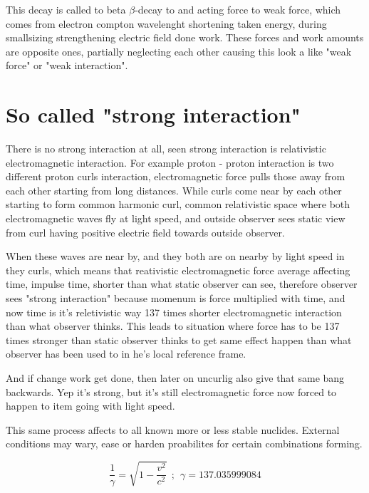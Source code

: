 This decay is called to beta $\beta$-decay to and acting force to weak force,
which comes from electron compton wavelenght shortening taken energy, during
smallsizing strengthening electric field done work. These forces and work
amounts are opposite ones, partially neglecting each other causing this look a
like "weak force" or "weak interaction".

\section{So called "strong interaction"}
\label{strong_interaction}

There is no strong interaction at all, seen strong interaction is relativistic
electromagnetic interaction. For example proton - proton interaction is two
different proton curls interaction, electromagnetic force pulls those away from
each other starting from long distances. While curls come near by each other
starting to form common harmonic curl, common relativistic space where both
electromagnetic waves fly at light speed, and outside observer sees static view
from curl having positive electric field towards outside observer.

When these waves are near by, and they both are on nearby by light speed in they
curls, which means that reativistic electromagnetic force average affecting time,
impulse time, shorter than what static observer can see, therefore observer sees
"strong interaction" because momenum is force multiplied with time, and now time
is it's reletivistic way 137\cite{FineStructureConst} times shorter electromagnetic
interaction than what observer thinks. This leads to situation where force has
to be 137 times stronger than static observer thinks to get same effect happen
\cite{TimeDilation} than what observer has been used to in he's local reference
frame.

And if change work get done, then later on uncurlig also give that same bang
backwards. Yep it's strong, but it's still electromagnetic force now forced to
happen to item going with light speed.

This same process affects to all known more or less stable nuclides\cite{Nuclides}.
External conditions may wary, ease or harden proabilites for certain combinations
forming.

\begin{equation} \label{eq:clock_rate} %
 \frac{1}{\gamma}=\sqrt{1-\frac{v^2}{c^2}}~~;~~\gamma=137.035999084
\end{equation}

